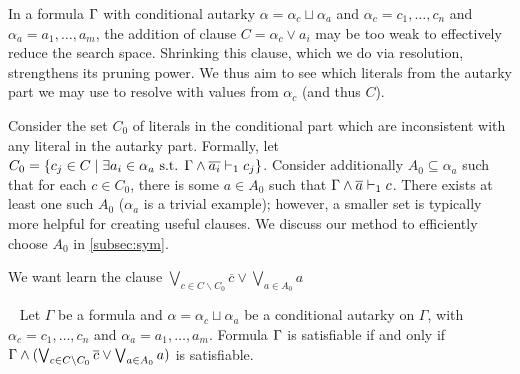 In a formula $\Gamma$ with conditional autarky $\alpha = \alpha_c \sqcup \alpha_a$ and $\alpha_c = c_1, \dots, c_n$ and $\alpha_a =
a_1, \dots, a_m$, the addition of clause $C = \alpha_c \lor a_i$ may be too weak to effectively reduce the search space.
Shrinking this clause, which we do via resolution, strengthens its pruning power.
We thus aim to see which literals from the autarky part we may use to resolve with values from $\alpha_c$ (and thus $C$).

Consider the set $C_0$ of literals in the conditional part which
are inconsistent with any literal in the autarky part. Formally, let $C_0 = \{c_j \in C \mid \exists a_i \in
\alpha_a \text{ s.t. } \Gamma \land \overline{a_i} \vdash_1 c_j \}$.
%
%
%
%
%
%
Consider additionally $A_0 \subseteq \alpha_a$ such that for each $c \in C_0$,
there is some $a \in A_0$ such that $\Gamma \land \overline{a} \vdash_1 c$.
There exists at least one such $A_0$ ($\alpha_a$ is a trivial example); however, a smaller set is typically more helpful for creating useful clauses. 
We discuss our method to efficiently choose $A_0$ in \autoref{subsec:sym}.



We want learn the clause $\bigvee_{c \in C \backslash C_0} \overline{c} \lor
\bigvee_{a \in A_0} a$


\begin{theorem}~\label{thm:shrunkgbcequisat}
    Let $\Gamma$ be a formula and $\alpha = \alpha_c \sqcup \alpha_a$ be a conditional autarky on $\Gamma$, with $\alpha_c = c_1, \dots, c_n$ and $\alpha_a = a_1, \dots, a_m$. Formula $\Gamma$ is satisfiable if and only if $\Gamma \land (\bigvee_{c \in C \backslash C_0} \overline{c} \lor \bigvee_{a \in A_0} a)$ is satisfiable.
\end{theorem}

